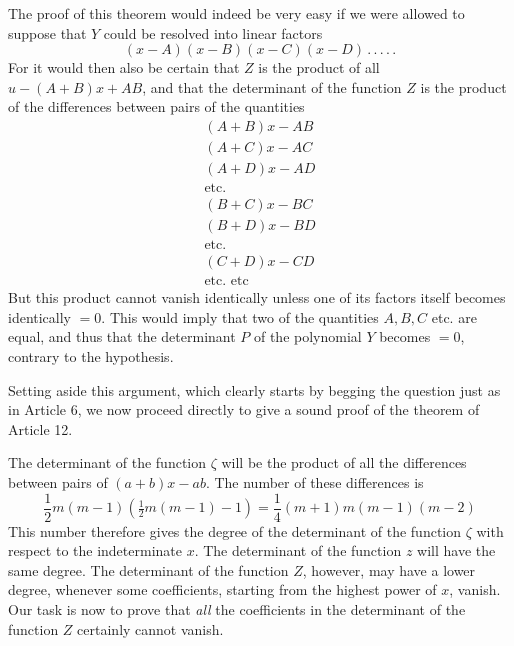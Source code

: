 The proof of this theorem would indeed be very easy if we were allowed to suppose that $Y$ could be resolved into linear factors
\[
(x-A)(x-B)(x-C)(x-D)\, .\, .\, .\, .\, .
\]
For it would then also be certain that $Z$ is the product of all $u-(A+B)x+AB$, and that the determinant of the function $Z$ is the product of the differences between pairs of the quantities
\[
\begin{gathered}
(A+B)x-AB\\
(A+C)x-AC\\
(A+D)x-AD\\
\text{etc.}\\
(B+C)x-BC\\
(B+D)x-BD\\
\text{etc.}\\
(C+D)x-CD\\
\text{etc. etc}
\end{gathered}
\]
But this product cannot vanish identically unless one of its factors itself becomes identically $=0$. This would imply that two of the quantities $A,B,C$ etc. are equal, and thus that the determinant $P$ of the polynomial $Y$ becomes $=0$, contrary to the hypothesis.

Setting aside this argument, which clearly starts by begging the question just as in Article 6, we now proceed directly to give a sound proof of the theorem of Article 12.

The determinant of the function $\zeta$ will be the product of all the differences between pairs of $(a+b)x-ab$. The number of these differences is
\[
\frac12m(m-1)(\tfrac12m(m-1)-1)=\frac14(m+1)m(m-1)(m-2)
\]
This number therefore gives the degree of the determinant of the function $\zeta$ with respect to the indeterminate $x$. The determinant of the function $z$ will have the same degree. The determinant of the function $Z$, however, may have a lower degree, whenever some coefficients, starting from the highest power of $x$, vanish. Our task is now to prove that \textit{all} the coefficients in the determinant of the function $Z$ certainly cannot vanish.

